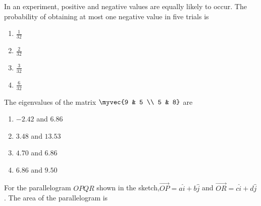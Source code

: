 \iffalse
\chapter{2012}
\author{EE24BTECH11011}
\section{ce}
\fi
   \item In an experiment, positive and negative values are equally likely to occur. The probability of obtaining at most one negative value in five trials is
   \begin{multicols}{4}
   \begin{enumerate}
       \item $\frac{1}{32}$
       \item $\frac{2}{32}$
       \item $\frac{3}{32}$
       \item $\frac{6}{32}$
   \end{enumerate}
   \end{multicols}
   \item The eigenvalues of the matrix $\myvec{9 & 5 \\ 5 & 8}$ are
   \begin{multicols}{4}
       \begin{enumerate}
           \item $-2.42$ and $6.86$
           \item $3.48$ and $13.53$
           \item $4.70$ and $6.86$
           \item $6.86$ and $9.50$
       \end{enumerate}
   \end{multicols}
   \item For the parallelogram $OPQR$ shown in the sketch,$\vec{OP} = a\hat{i}+b\hat{j}$ and $\vec{OR} = c\hat{i}+d\hat{j}$ . The area of the parallelogram is
	   \begin{figure}[!ht]
\centering
{}%
\end{figure}\\
